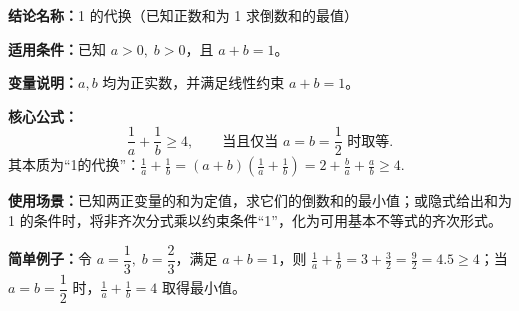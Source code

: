 \textbf{结论名称：}1 的代换（已知正数和为 1 求倒数和的最值）

\textbf{适用条件：}已知 \(a>0,\;b>0\)，且 \(a+b=1\)。

\textbf{变量说明：}\(a,b\) 均为正实数，并满足线性约束 \(a+b=1\)。

\textbf{核心公式：}
\[
\boxed{\frac{1}{a}+\frac{1}{b}\geqslant 4},\qquad\text{当且仅当 }a=b=\frac12\text{ 时取等}.
\]
其本质为“1的代换”：\(\displaystyle\frac1a+\frac1b=(a+b)\!\left(\frac1a+\frac1b\right)=2+\frac{b}{a}+\frac{a}{b}\geqslant 4\).

\textbf{使用场景：}已知两正变量的和为定值，求它们的倒数和的最小值；或隐式给出和为 1 的条件时，将非齐次分式乘以约束条件“1”，化为可用基本不等式的齐次形式。

\textbf{简单例子：}令 \(a=\dfrac13,\;b=\dfrac23\)，满足 \(a+b=1\)，则
\(\displaystyle\frac1a+\frac1b=3+\frac32=\frac92=4.5\geqslant 4\)；当 \(a=b=\dfrac12\) 时，\(\frac1a+\frac1b=4\) 取得最小值。